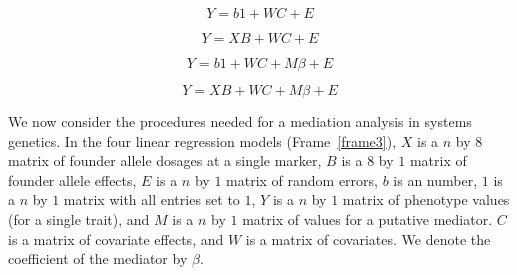 \documentclass[oneside]{book}\usepackage[]{graphicx}\usepackage[]{color}
\newenvironment{frameenv}[1]
    {\begin{myfloat}[tb]
    \begin{mdframed}[roundcorner=10pt,backgroundcolor=blue!10]
    \caption{#1}
    }
    {%
    \end{mdframed}\end{myfloat}
    }
\begin{document}


\begin{frameenv}{Four regressions for a single mediation analysis}\label{frame3}


\begin{equation}
Y = b1 + WC + E
\label{model1}
\end{equation}

\begin{equation}
Y = XB + WC + E
\label{model2}
\end{equation}

\begin{equation}
Y = b1 + WC + M\beta + E
\label{model3}
\end{equation}

\begin{equation}
Y = XB + WC + M\beta + E
\label{model4}
\end{equation}
\end{frameenv}

We now consider the procedures needed for a mediation analysis in systems genetics.
In the four linear regression models (Frame~\ref{frame3}), $X$ is a $n$ by $8$ matrix of 
founder allele dosages at a single marker, $B$ is a $8$ by $1$ matrix of founder allele 
effects, $E$ is a $n$ by $1$ matrix of random errors, $b$ is an number, $1$ is 
a $n$ by $1$ matrix with all entries set to $1$, $Y$ is a $n$ by $1$ matrix of 
phenotype values (for a single trait), and $M$ is a $n$ by $1$ matrix of values for a putative mediator. 
$C$ is a matrix of covariate effects, and $W$ is a matrix of covariates. 
We denote the coefficient of the mediator by $\beta$.
\end{document}
